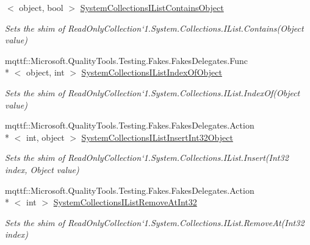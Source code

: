 \begin{DoxyCompactItemize}
$<$ object, bool $>$ \hyperlink{class_system_1_1_collections_1_1_object_model_1_1_fakes_1_1_shim_read_only_collection_3_01_t_01_4_a709fafaca72ee3f187a7721c860d4465}{System\-Collections\-I\-List\-Contains\-Object}
\begin{DoxyCompactList}\small\item\em Sets the shim of Read\-Only\-Collection`1.System.\-Collections.\-I\-List.\-Contains(\-Object value)\end{DoxyCompactList}\item 
mqttf\-::\-Microsoft.\-Quality\-Tools.\-Testing.\-Fakes.\-Fakes\-Delegates.\-Func\\*
$<$ object, int $>$ \hyperlink{class_system_1_1_collections_1_1_object_model_1_1_fakes_1_1_shim_read_only_collection_3_01_t_01_4_a2449a6162df8eaf90d5cd2e5099b37a6}{System\-Collections\-I\-List\-Index\-Of\-Object}
\begin{DoxyCompactList}\small\item\em Sets the shim of Read\-Only\-Collection`1.System.\-Collections.\-I\-List.\-Index\-Of(\-Object value)\end{DoxyCompactList}\item 
mqttf\-::\-Microsoft.\-Quality\-Tools.\-Testing.\-Fakes.\-Fakes\-Delegates.\-Action\\*
$<$ int, object $>$ \hyperlink{class_system_1_1_collections_1_1_object_model_1_1_fakes_1_1_shim_read_only_collection_3_01_t_01_4_ada4fc82f32ddd7b401d7dcb9fe38e48e}{System\-Collections\-I\-List\-Insert\-Int32\-Object}
\begin{DoxyCompactList}\small\item\em Sets the shim of Read\-Only\-Collection`1.System.\-Collections.\-I\-List.\-Insert(\-Int32 index, Object value)\end{DoxyCompactList}\item 
mqttf\-::\-Microsoft.\-Quality\-Tools.\-Testing.\-Fakes.\-Fakes\-Delegates.\-Action\\*
$<$ int $>$ \hyperlink{class_system_1_1_collections_1_1_object_model_1_1_fakes_1_1_shim_read_only_collection_3_01_t_01_4_a0328c80e456f159b93b75041cfb02936}{System\-Collections\-I\-List\-Remove\-At\-Int32}
\begin{DoxyCompactList}\small\item\em Sets the shim of Read\-Only\-Collection`1.System.\-Collections.\-I\-List.\-Remove\-At(\-Int32 index)\end{DoxyCompactList}\item 

\end{DoxyCompactItemize}

